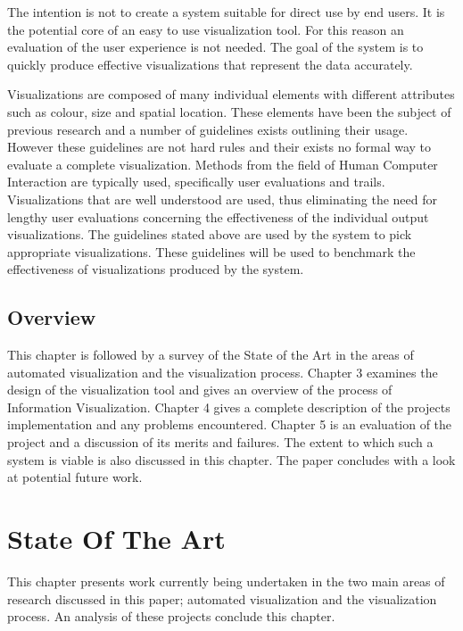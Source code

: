 \documentclass[a4paper, 11pt, titlepage, onehalfspacing]{report}
\begin{document}
The intention is not to create a system suitable for direct use by end users. It is the potential core of an easy to use visualization tool. For this reason an evaluation of the user experience is not needed. The goal of the system is to quickly produce effective visualizations that represent the data accurately.

Visualizations are composed of many individual elements with different attributes such as colour, size and spatial location. These elements have been the subject of previous research and a number of guidelines exists outlining their usage. However these guidelines are not hard rules and their exists no formal way to evaluate a complete visualization. Methods from the field of Human Computer Interaction are typically used, specifically user evaluations and trails. Visualizations that are well understood are used, thus eliminating the need for lengthy user evaluations concerning the effectiveness of the individual output visualizations. The guidelines stated above are used by the system to pick appropriate visualizations. These guidelines will be used to benchmark the effectiveness of visualizations produced by the system.

	\section{Overview}
 
This chapter is followed by a survey of the State of the Art in the areas of automated visualization and the visualization process. Chapter 3 examines the design of the visualization tool and gives an overview of the process of Information Visualization. Chapter 4 gives a complete description of the projects implementation and any problems encountered. Chapter 5 is an evaluation of the project and a discussion of its merits and failures. The extent to which such a system is viable is also discussed in this chapter. The paper concludes with a look at potential future work.


	\chapter{State Of The Art}

This chapter presents work currently being undertaken in the two main areas of research discussed in this paper; automated visualization and the visualization process. An analysis of these projects conclude this chapter.
\end{document}

